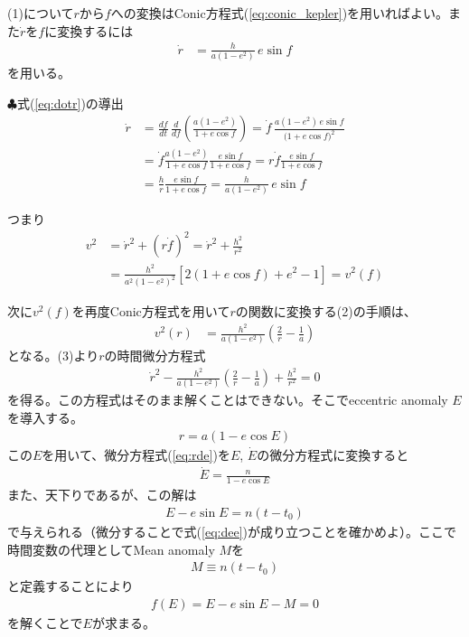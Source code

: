(1)について$r$から$f$への変換はConic方程式(\ref{eq:conic_kepler})を用いればよい。また$\dot{r}$を$f$に変換するには
\begin{align}
\label{eq:dotr}
\dot{r} &= \frac{h}{a(1-e^{2})}\,e\sin f 
\end{align}
を用いる。

\begin{itembox}{$\clubsuit$式(\ref{eq:dotr})の導出}
\footnotesize
\color{gray}
\begin{align}
    \dot r
  &=\frac{df}{dt}
   \,\frac{d}{df}\!
     \left(
       \frac{a(1-e^{2})}{1+e\cos f}
     \right)
  =\dot f\,
    \frac{a(1-e^{2})\,e\sin f}{\bigl(1+e\cos f\bigr)^{2}}
    \nonumber \\
    &= \dot{f} \frac{a (1-e^2)}{1 + e \cos{f}} \frac{e \sin{f}}{1 + e \cos{f}} = r \dot{f} \frac{e \sin{f}}{1 + e \cos{f}} \nonumber\\
&= \frac{h}{r} \frac{e \sin{f}}{1 + e \cos{f}}
= \frac{h}{a(1-e^{2})}\,e\sin f
\end{align}
\end{itembox}

つまり
\begin{align}
    v^2 &= \dot{r}^2 + (r \dot{f})^2 = \dot{r}^2 + \frac{h^2}{r^2} \nonumber \\
    &= \frac{h^2}{a^2(1-e^2)^2} [2 (1 + e\cos{f}) + e^2 - 1 ] = v^2(f)
\end{align}



次に$v^2(f)$を再度Conic方程式を用いて$r$の関数に変換する(2)の手順は、
\begin{align}
    v^2(r) &= \frac{h^2}{a (1 - e^2)} \left( \frac{2}{r} - \frac{1}{a} \right)
\end{align}
となる。(3)より$r$の時間微分方程式
\begin{align}
\label{eq:rde}
    \dot{r}^2 - \frac{h^2}{a (1-e^2)}  \left( \frac{2}{r} - \frac{1}{a} \right) + \frac{h^2}{r^2} = 0
\end{align}
を得る。この方程式はそのまま解くことはできない。そこでeccentric anomaly $E$を導入する。
\begin{align}
\label{eq:eanomaly}
    r = a (1 - e \cos{E})
\end{align}
この$E$を用いて、微分方程式(\ref{eq:rde})を$E$, $\dot{E}$の微分方程式に変換すると
\begin{align}
\label{eq:dee}
    \dot{E} = \frac{n}{1 - e \cos{E}}
\end{align}
また、天下りであるが、この解は
\begin{align}
    E - e \sin{E} = n (t -t_0)
\end{align}
で与えられる（微分することで式(\ref{eq:dee})が成り立つことを確かめよ）。ここで時間変数の代理としてMean anomaly $M$を
\begin{align}
    M \equiv n (t - t_0)
\end{align}
と定義することにより
\begin{align}
\label{eq:dee_sol_M}
    f(E) = E - e \sin{E} - M = 0
\end{align}
を解くことで$E$が求まる。

